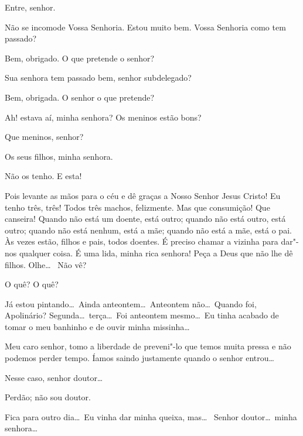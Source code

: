  Entre, senhor. 

  Não se incomode
Vossa Senhoria. Estou muito bem. Vossa Senhoria como tem passado?

 Bem, obrigado. O que pretende o senhor?

 Sua senhora tem passado bem, senhor subdelegado?

 Bem, obrigada. O senhor o que pretende?

 Ah! estava aí, minha senhora? Os meninos estão bons?

 Que meninos, senhor?

 Os seus filhos, minha senhora.

 Não os tenho. E esta!

 Pois levante as mãos para o céu e dê graças a Nosso Senhor Jesus
Cristo!  Eu tenho três, três!
Todos três machos, felizmente. Mas que consumição! Que canseira! Quando não está
um doente, está outro; quando não está outro, está outro; quando não está
nenhum, está a mãe; quando não está a mãe, está o pai. Às vezes estão, filhos e
pais, todos doentes. É preciso chamar a
vizinha para dar"-nos qualquer coisa. É uma lida, minha rica senhora!
Peça a Deus que não lhe dê filhos. Olhe\ldots\  Não vê?

 O quê? O quê?

 Já estou pintando\ldots\ Ainda anteontem\ldots\ Anteontem
não\ldots\ Quando foi, Apolinário? Segunda\ldots\ terça\ldots\ Foi anteontem
mesmo\ldots\  Eu tinha acabado de tomar o meu banhinho e de ouvir minha
missinha\ldots

   Meu caro senhor, tomo a liberdade
de preveni"-lo que temos muita pressa e não
podemos perder tempo. Íamos saindo justamente quando o senhor entrou\ldots

  Nesse caso, senhor doutor\ldots

 Perdão; não sou doutor.

 Fica para outro dia\ldots\ Eu vinha dar minha queixa, mas\ldots\
 Senhor doutor\ldots\ minha
senhora\ldots\ 

